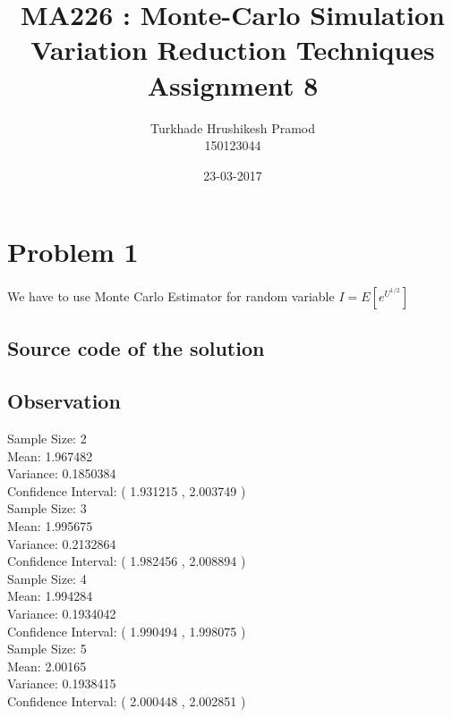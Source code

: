 \documentclass{article}
\title{%
	MA226 : Monte-Carlo Simulation\\
	 Variation Reduction Techniques\\
	 \large Assignment 8}
\date{23-03-2017}
\author{%
	Turkhade Hrushikesh Pramod\\
	150123044	}
\begin{document}
	\maketitle
	
	\newpage
	
	\section{Problem 1}
	\paragraph{}
		We have to use Monte Carlo Estimator for random variable $I = E[e^{U^{1/2}}]$
			
		
	\subsection{Source code of the solution}
		
	
	\subsection{Observation}
	
		Sample Size:  2 \\
	Mean:  1.967482 \\
	Variance:  0.1850384 \\
	Confidence Interval: ( 1.931215  ,  2.003749 ) \\
	
	Sample Size:  3 \\
	Mean:  1.995675 \\
	Variance:  0.2132864 \\
	Confidence Interval: ( 1.982456  ,  2.008894 ) \\

	Sample Size:  4 \\
	Mean:  1.994284 \\
	Variance:  0.1934042 \\
	Confidence Interval: ( 1.990494  ,  1.998075 ) \\

	Sample Size:  5 \\
	Mean:  2.00165 \\
	Variance:  0.1938415 \\
	Confidence Interval: ( 2.000448  ,  2.002851 )\\
	    
	    \clearpage
	    
\end{document}
